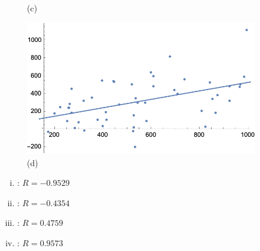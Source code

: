 \documentclass[11pt,letterpaper]{article}
\begin{document}
\begin{figure}[!ht]
\begin{minipage}{0.45\textwidth}
	   \caption*{(c)}
	\end{minipage}
	\begin{minipage}{0.45\textwidth}
	   \centering
	   \includegraphics[width=0.9\textwidth]{reg4.png}
	   \caption*{(d)}
	\end{minipage}
	\end{figure}

\begin{enumerate}[(i)]
\item \underline{\hspace{1.5cm}}: $R= -0.9529$
\item \underline{\hspace{1.5cm}}: $R= -0.4354$
\item \underline{\hspace{1.5cm}}: $R= 0.4759$
\item\underline{\hspace{1.5cm}}: $R= 0.9573$
\end{enumerate} 





\newpage
\end{document}
